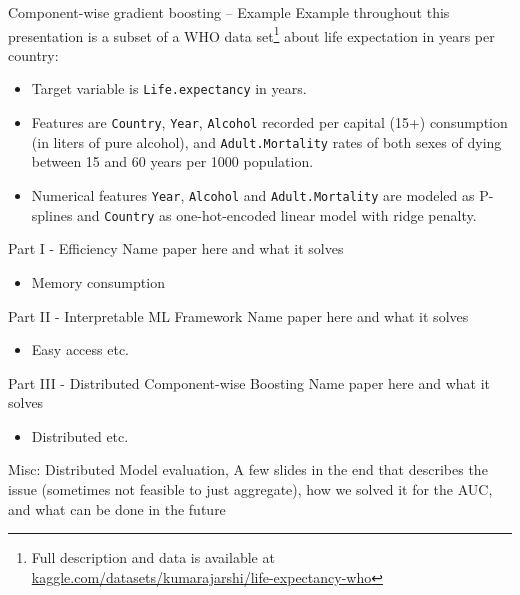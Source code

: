 \documentclass[10pt]{beamer}
\begin{document}
\begin{frame}{Component-wise gradient boosting – Example}
  Example throughout this presentation is a subset of a WHO data set\footnote[frame,1]{Full description and data is available at \url{kaggle.com/datasets/kumarajarshi/life-expectancy-who}} about life expectation in years per country:

  \begin{itemize}
    \item
      Target variable is \texttt{Life.expectancy} in years.
    \item
      Features are \texttt{Country}, \texttt{Year}, \texttt{Alcohol} recorded per capital (15+) consumption (in liters of pure alcohol), and \texttt{Adult.Mortality} rates of both sexes of dying between 15 and 60 years per 1000 population.

    \item
      Numerical features \texttt{Year}, \texttt{Alcohol} and \texttt{Adult.Mortality} are modeled as P-splines \citep{eilers1996flexible} and \texttt{Country} as one-hot-encoded linear model with ridge penalty.

  \end{itemize}
\end{frame}



\begin{frame}{Part I - Efficiency}
  Name paper here and what it solves
  \begin{itemize}
    \item
      Memory consumption
  \end{itemize}
\end{frame}

\begin{frame}{Part II - Interpretable ML Framework}
  Name paper here and what it solves
  \begin{itemize}
    \item
      Easy access etc.
  \end{itemize}
\end{frame}

\begin{frame}{Part III - Distributed Component-wise Boosting}
  Name paper here and what it solves
  \begin{itemize}
    \item
      Distributed etc.
  \end{itemize}
  Misc: Distributed Model evaluation, A few slides in the end that describes the issue (sometimes not feasible to just aggregate), how we solved it for the AUC, and what can be done in the future
\end{frame}
\end{document}
